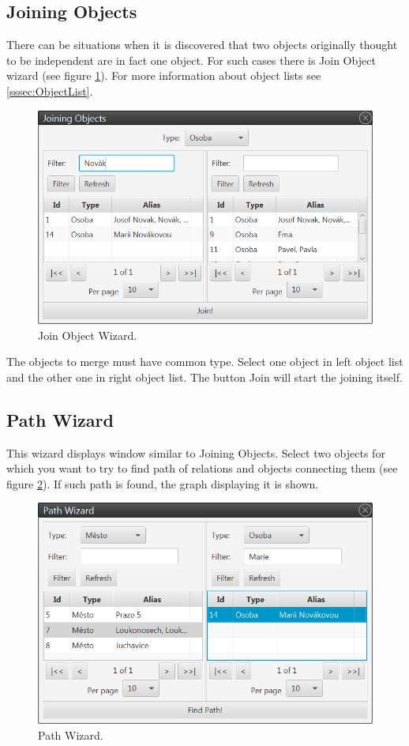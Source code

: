 \subsection{Joining Objects}
\label{ssec:JoinObjects}

There can be situations when it is discovered that two objects originally
thought to be independent are in fact one object. For such cases there is Join
Object wizard (see figure \ref{fig:Join}). For more information about object
lists see \ref{sssec:ObjectList}.

\begin{figure}[!htb]
        \centering
        \includegraphics[width=\textwidth]{Images/join}
        \caption{Join Object Wizard.}
        \label{fig:Join}
\end{figure}

The objects to merge must have common type. Select one object in left object
list and the other one in right object list. The button Join will start the
joining itself.

\subsection{Path Wizard}
This wizard displays window similar to Joining Objects. Select two objects
for which you want to try to find path of relations and objects connecting them
(see figure \ref{fig:Path}).
If such path is found, the graph displaying it is shown.


\begin{figure}[!htb]
        \centering
        \includegraphics[width=\textwidth]{Images/path}
        \caption{Path Wizard.}
        \label{fig:Path}
\end{figure}

